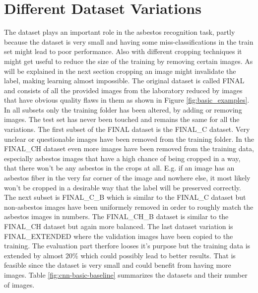 \section{Different Dataset Variations}

The dataset plays an important role in the asbestos recognition task, partly because the dataset is very small and having some miss-classifications in the train set might lead to poor performance. Also with different cropping techniques it might get useful to reduce the size of the training by removing certain images. As will be explained in the next section cropping an image might invalidate the label, making learning almost impossible. The original dataset is called FINAL and consists of all the provided images from the laboratory reduced by images that have obvious quality flaws in them as shown in Figure  \ref{fig:basic_examples}. In all subsets only the training folder has been altered, by adding or removing images. The test set has never been touched and remains the same for all the variations. The first subset of the FINAL dataset is the FINAL\_C dataset. Very unclear or questionable images have been removed from the training folder. In the FINAL\_CH dataset even more images have been removed from the training data, especially asbestos images that have a high chance of being cropped in a way, that there won't be any asbestos in the crops at all. E.g. if an image has an asbestos fiber in the very far corner of the image and nowhere else, it most likely won't be cropped in a desirable way that the label will be preserved correctly. The next subset is FINAL\_C\_B which is similar to the FINAL\_C dataset but non-asbestos images have been uniformely removed in order to roughly match the asbestos images in numbers. The FINAL\_CH\_B dataset is similar to the FINAL\_CH dataset but again more balanced. The last dataset variation is FINAL\_EXTENDED where the validation images have been copied to the training. The evaluation part therfore looses it's purpose but the training data is extended by almost 20\% which could possibly lead to better results. That is feasible since the dataset is very small and could benefit from having more images. Table \ref{fig:cnn-basic-baseline} summarizes the datasets and their number of images.


